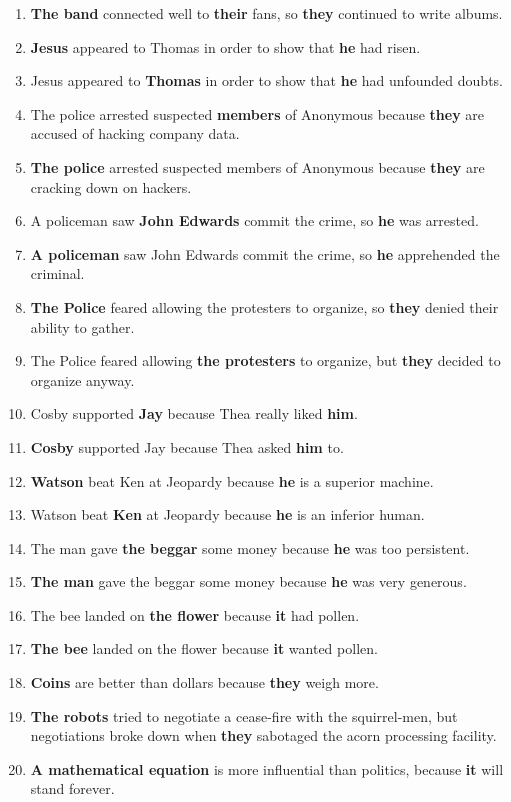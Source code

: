 \documentclass{article}
\begin{document}
\begin{enumerate}
	\item {\bf The band} connected well to {\bf their} fans, so {\bf they} continued to write albums.
	\item {\bf Jesus} appeared to Thomas in order to show that {\bf he} had risen.
	\item Jesus appeared to {\bf Thomas} in order to show that {\bf he} had unfounded doubts.
	\item The police arrested suspected {\bf members} of Anonymous because {\bf they} are accused of hacking company data.
	\item {\bf The police} arrested suspected members of Anonymous because {\bf they} are cracking down on hackers.
	\item A policeman saw {\bf John Edwards} commit the crime, so {\bf he} was arrested.
	\item {\bf A policeman} saw John Edwards commit the crime, so {\bf he} apprehended the criminal.
	\item {\bf The Police} feared allowing the protesters to organize, so {\bf they} denied their ability to gather.
	\item The Police feared allowing {\bf the protesters} to organize, but {\bf they} decided to organize anyway.
	\item Cosby supported {\bf Jay} because Thea really liked {\bf him}.
	\item {\bf Cosby} supported Jay because Thea asked {\bf him} to.
	\item {\bf Watson} beat Ken at Jeopardy because {\bf he} is a superior machine.
	\item Watson beat {\bf Ken} at Jeopardy because {\bf he} is an inferior human.
	\item The man gave {\bf the beggar} some money because {\bf he} was too persistent.
	\item {\bf The man} gave the beggar some money because {\bf he} was very generous.
	\item The bee landed on {\bf the flower} because {\bf it} had pollen.
	\item {\bf The bee} landed on the flower because {\bf it} wanted pollen.
	\item {\bf Coins} are better than dollars because {\bf they} weigh more.
	\item {\bf The robots} tried to negotiate a cease-fire with the squirrel-men, but negotiations broke down when {\bf they} sabotaged the acorn processing facility.
	\item {\bf A mathematical equation} is more influential than politics, because {\bf it} will stand forever.

\end{enumerate}
\end{document}
